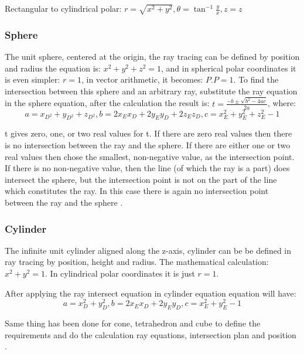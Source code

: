 \documentclass[a4paper, 12pt]{article}
\begin{document}
Rectangular to cylindrical polar: $r=\sqrt{x^2+y^2}, \theta=\tan^{-1}{\frac{y}{x}}, z=z$ 
\cite{Learn Computer Graphics From Scratch}

\subsubsection{Sphere}
The unit sphere, centered at the origin, the ray tracing can be defined by position  and radius the equation is: $x^2+y^2+z^2=1$, and in spherical polar coordinates it is even simpler: $r=1$, in vector arithmetic, it becomes: $P.P=1$. To find the intersection between this sphere and an arbitrary ray, substitute the ray equation in the sphere equation, after the calculation the result is: $t=\frac{-b\pm\sqrt{b^2-4ac}}{2a}$, where: $$a=x_{D^2}+y_{D^2}+z_{D^2}, 
b={2 x_E x_D + 2 y_E y_D + 2 z_E z_D}, c=x_E^2 + y_E^2 + z_E^2 - 1 $$

t gives zero, one, or two real values for t. If there are zero real values then there is no intersection between the ray and the sphere. If there are either one or two real values then chose the smallest, non-negative value, as the intersection point. If there is no non-negative value, then the line (of which the ray is a part) does intersect the sphere, but the intersection point is not on the part of the line which constitutes the ray. In this case there is again no intersection point between the ray and the sphere \cite{Ray tracing primitives}.

\subsubsection{Cylinder}
The infinite unit cylinder aligned along the z-axis, cylinder can be be defined in ray tracing by position, height and radius. The mathematical calculation: $x^2+y^2=1$. In cylindrical polar coordinates it is just $r=1$.

After applying the ray intersect equation in cylinder equation equation will have: 
$$a=x_D^2+y_D^2, b=2 x_E x_D + 2 y_E y_D, c=x_E^2+y_E^2-1$$

Same thing has been done for cone, tetrahedron and cube to define the requirements and  do the calculation ray equations, intersection plan and position \cite{Ray tracing primitives}.
\end{document}
